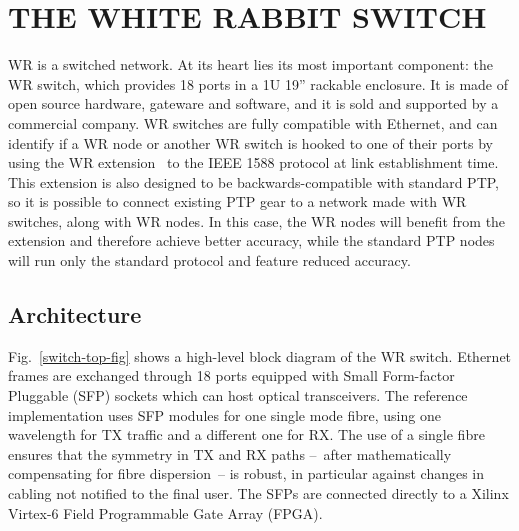 \documentclass{../JAC2003}
\begin{document}
\section{THE WHITE RABBIT SWITCH}

WR is a switched network. At its heart lies its most important
component: the WR switch, which provides 18 ports in a 1U 19''
rackable enclosure. It is made of open source hardware, gateware and
software, and it is sold and supported by a commercial company. WR
switches are fully compatible with Ethernet, and can identify if a WR
node or another WR switch is hooked to one of their ports by using the
WR extension~\cite{wr-extension-ref} to the IEEE 1588 protocol at
link establishment time. This extension is also designed to be
backwards-compatible with standard PTP, so it is possible to connect
existing PTP gear to a network made with WR switches, along with WR
nodes. In this case, the WR nodes will benefit from the extension and
therefore achieve better accuracy, while the standard PTP nodes will
run only the standard protocol and feature reduced accuracy.

\subsection{Architecture}

Fig.~\ref{switch-top-fig} shows a high-level block diagram of the WR
switch. Ethernet frames are exchanged through 18 ports equipped with
Small Form-factor Pluggable (SFP) sockets which can host optical
transceivers. The reference implementation uses SFP modules for one
single mode fibre, using one wavelength for TX traffic and a different
one for RX. The use of a single fibre ensures that the symmetry in TX
and RX paths --~after mathematically compensating for fibre
dispersion~-- is robust, in particular against changes in cabling not
notified to the final user. The SFPs are connected directly to a
Xilinx Virtex-6 Field Programmable Gate Array (FPGA).
\end{document}
